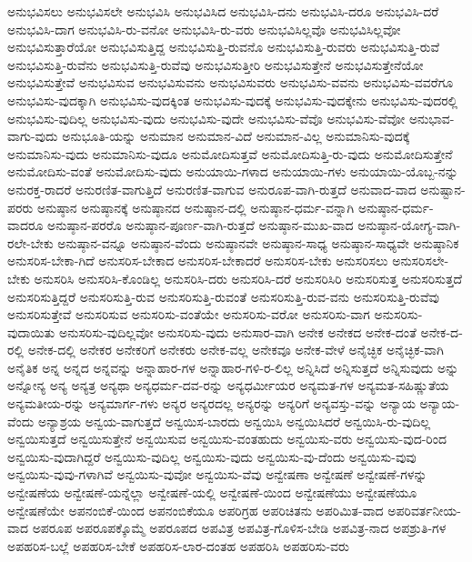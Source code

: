 {ಅನುಭವಿಸಲು
ಅನುಭವಿಸಲೇ
ಅನುಭವಿಸಿ
ಅನುಭವಿಸಿದ
ಅನುಭವಿಸಿ-ದನು
ಅನುಭವಿಸಿ-ದರೂ
ಅನುಭವಿಸಿ-ದರೆ
ಅನುಭವಿಸಿ-ದಾಗ
ಅನುಭವಿಸಿ-ರು-ವನೋ
ಅನುಭವಿಸಿ-ರು-ವರು
ಅನುಭವಿಸಿಲ್ಲವೊ
ಅನುಭವಿಸಿಲ್ಲವೋ
ಅನುಭವಿಸುತ್ತಾರೆಯೋ
ಅನುಭವಿಸುತ್ತಿದ್ದ
ಅನುಭವಿಸುತ್ತಿ-ರುವನೊ
ಅನುಭವಿಸುತ್ತಿ-ರುವರು
ಅನುಭವಿಸುತ್ತಿ-ರುವೆ
ಅನುಭವಿಸುತ್ತಿ-ರುವೆನು
ಅನುಭವಿಸುತ್ತಿ-ರುವೆವು
ಅನುಭವಿಸುತ್ತೀರಿ
ಅನುಭವಿಸುತ್ತೇನೆ
ಅನುಭವಿಸುತ್ತೇನೆಯೋ
ಅನುಭವಿಸುತ್ತೇವೆ
ಅನುಭವಿಸುವ
ಅನುಭವಿಸುವನು
ಅನುಭವಿಸುವರು
ಅನುಭವಿಸು-ವವನು
ಅನುಭವಿಸು-ವವರೆಗೂ
ಅನುಭವಿಸು-ವುದಕ್ಕಾಗಿ
ಅನುಭವಿಸು-ವುದಕ್ಕಿಂತ
ಅನುಭವಿಸು-ವುದಕ್ಕೆ
ಅನುಭವಿಸು-ವುದಕ್ಕೇನು
ಅನುಭವಿಸು-ವುದರಲ್ಲಿ
ಅನುಭವಿಸು-ವುದಿಲ್ಲ
ಅನುಭವಿಸು-ವುದು
ಅನುಭವಿಸು-ವುದೇ
ಅನುಭವಿಸು-ವೆವೊ
ಅನುಭವಿಸು-ವೆವೋ
ಅನುಭಾವ-ವಾಗು-ವುದು
ಅನುಭೂತಿ-ಯನ್ನು
ಅನುಮಾನ
ಅನುಮಾನ-ವಿದೆ
ಅನುಮಾನ-ವಿಲ್ಲ
ಅನುಮಾನಿಸು-ವುದಕ್ಕೆ
ಅನುಮಾನಿಸು-ವುದು
ಅನುಮಾನಿಸು-ವುದೂ
ಅನುಮೋದಿಸುತ್ತವೆ
ಅನುಮೋದಿಸುತ್ತಿ-ರು-ವುದು
ಅನುಮೋದಿಸುತ್ತೇನೆ
ಅನುಮೋದಿಸು-ವಂತೆ
ಅನುಮೋದಿಸು-ವುದು
ಅನುಯಾಯಿ-ಗಳಾದ
ಅನುಯಾಯಿ-ಗಳು
ಅನುಯಾಯಿ-ಯೊಬ್ಬ-ನನ್ನು
ಅನುರಕ್ತ-ರಾದರೆ
ಅನುರಣಿತ-ವಾಗುತ್ತಿದೆ
ಅನುರಣಿತ-ವಾಗುವ
ಅನುರೂಪ-ವಾಗಿ-ರುತ್ತದೆ
ಅನುವಾದ-ವಾದ
ಅನುಷ್ಟಾನ-ಪರರು
ಅನುಷ್ಠಾನ
ಅನುಷ್ಠಾನಕ್ಕೆ
ಅನುಷ್ಠಾನದ
ಅನುಷ್ಠಾನ-ದಲ್ಲಿ
ಅನುಷ್ಠಾನ-ಧರ್ಮ-ವನ್ನಾಗಿ
ಅನುಷ್ಠಾನ-ಧರ್ಮ-ವಾದರೂ
ಅನುಷ್ಠಾನ-ಪರರೊ
ಅನುಷ್ಠಾನ-ಪೂರ್ಣ-ವಾಗಿ-ರುತ್ತದೆ
ಅನುಷ್ಠಾನ-ಮುಖ-ವಾದ
ಅನುಷ್ಠಾನ-ಯೋಗ್ಯ-ವಾಗಿ-ರಲೇ-ಬೇಕು
ಅನುಷ್ಠಾನ-ವನ್ನೂ
ಅನುಷ್ಠಾನ-ವೆಂದು
ಅನುಷ್ಠಾನವೇ
ಅನುಷ್ಠಾನ-ಸಾಧ್ಯ
ಅನುಷ್ಠಾನ-ಸಾಧ್ಯವೇ
ಅನುಷ್ಠಾನಿಕ
ಅನುಸರಿಸ-ಬೇಕಾ-ಗಿದೆ
ಅನುಸರಿಸ-ಬೇಕಾದ
ಅನುಸರಿಸ-ಬೇಕಾದರೆ
ಅನುಸರಿಸ-ಬೇಕು
ಅನುಸರಿಸಲು
ಅನುಸರಿಸಲೇ-ಬೇಕು
ಅನುಸರಿಸಿ
ಅನುಸರಿಸಿ-ಕೊಂಡಿಲ್ಲ
ಅನುಸರಿಸಿ-ದರು
ಅನುಸರಿಸಿ-ದರೆ
ಅನುಸರಿಸಿರಿ
ಅನುಸರಿಸುತ್ತ
ಅನುಸರಿಸುತ್ತದೆ
ಅನುಸರಿಸುತ್ತಿದ್ದರೆ
ಅನುಸರಿಸುತ್ತಿ-ರುವ
ಅನುಸರಿಸುತ್ತಿ-ರುವಂತೆ
ಅನುಸರಿಸುತ್ತಿ-ರುವ-ವನು
ಅನುಸರಿಸುತ್ತಿ-ರುವೆವು
ಅನುಸರಿಸುತ್ತೇವೆ
ಅನುಸರಿಸುವ
ಅನುಸರಿಸು-ವಂತೆಯೇ
ಅನುಸರಿಸು-ವರೋ
ಅನುಸರಿಸು-ವಾಗ
ಅನುಸರಿಸು-ವುದಾಯಿತು
ಅನುಸರಿಸು-ವುದಿಲ್ಲವೋ
ಅನುಸರಿಸು-ವುದು
ಅನುಸಾರ-ವಾಗಿ
ಅನೇಕ
ಅನೇಕದ
ಅನೇಕ-ದಂತೆ
ಅನೇಕ-ದ-ರಲ್ಲಿ
ಅನೇಕ-ದಲ್ಲಿ
ಅನೇಕರ
ಅನೇಕರಿಗೆ
ಅನೇಕರು
ಅನೇಕ-ವಲ್ಲ
ಅನೇಕವೂ
ಅನೇಕ-ವೇಳೆ
ಅನೈಚ್ಛಿಕ
ಅನೈಚ್ಛಿಕ-ವಾಗಿ
ಅನೈತಿಕ
ಅನ್ನ
ಅನ್ನದ
ಅನ್ನವನ್ನು
ಅನ್ನಾಹಾರ-ಗಳ
ಅನ್ನಾಹಾರ-ಗಳಿ-ರ-ಲಿಲ್ಲ
ಅನ್ನಿಸಿದೆ
ಅನ್ನಿಸುತ್ತದೆ
ಅನ್ನಿಸುವುದು
ಅನ್ನು
ಅನ್ನೋನ್ಯ
ಅನ್ಯ
ಅನ್ಯತ್ರ
ಅನ್ಯಥಾ
ಅನ್ಯಧರ್ಮ-ದವ-ರನ್ನು
ಅನ್ಯಧರ್ಮೀಯರ
ಅನ್ಯಮತ-ಗಳ
ಅನ್ಯಮತ-ಸಹಿಷ್ಣುತೆಯ
ಅನ್ಯಮತೀಯ-ರನ್ನು
ಅನ್ಯಮಾರ್ಗ-ಗಳು
ಅನ್ಯರ
ಅನ್ಯರದಲ್ಲ
ಅನ್ಯರನ್ನು
ಅನ್ಯರಿಗೆ
ಅನ್ಯವಸ್ತು-ವನ್ನು
ಅನ್ಯಾಯ
ಅನ್ಯಾಯ-ವೆಂದು
ಅನ್ಯಾಶ್ರಯ
ಅನ್ವಯ-ವಾಗುತ್ತದೆ
ಅನ್ವಯಿಸ-ಬಾರದು
ಅನ್ವಯಿಸಿ
ಅನ್ವಯಿಸಿದರೆ
ಅನ್ವಯಿಸಿ-ರು-ವುದಿಲ್ಲ
ಅನ್ವಯಿಸುತ್ತದೆ
ಅನ್ವಯಿಸುತ್ತೇನೆ
ಅನ್ವಯಿಸುವ
ಅನ್ವಯಿಸು-ವಂತಹುದು
ಅನ್ವಯಿಸು-ವರು
ಅನ್ವಯಿಸು-ವುದ-ರಿಂದ
ಅನ್ವಯಿಸು-ವುದಾಗಿದ್ದರೆ
ಅನ್ವಯಿಸು-ವುದಿಲ್ಲ
ಅನ್ವಯಿಸು-ವುದು
ಅನ್ವಯಿಸು-ವು-ದೆಂದು
ಅನ್ವಯಿಸು-ವುವು
ಅನ್ವಯಿಸು-ವುವು-ಗಳಾಗಿವೆ
ಅನ್ವಯಿಸು-ವುವೋ
ಅನ್ವಯಿಸು-ವೆವು
ಅನ್ವೇಷಣಾ
ಅನ್ವೇಷಣೆ
ಅನ್ವೇಷಣೆ-ಗಳನ್ನು
ಅನ್ವೇಷಣೆಯ
ಅನ್ವೇಷಣೆ-ಯನ್ನೆಲ್ಲಾ
ಅನ್ವೇಷಣೆ-ಯಲ್ಲಿ
ಅನ್ವೇಷಣೆ-ಯಿಂದ
ಅನ್ವೇಷಣೆಯು
ಅನ್ವೇಷಣೆಯೂ
ಅನ್ವೇಷಣೆಯೇ
ಅಪನಂಬಿಕೆ-ಯಿಂದ
ಅಪನಂಬಿಕೆಯೂ
ಅಪರಿಗ್ರಹ
ಅಪರಿಚಿತನು
ಅಪರಿಮಿತ-ವಾದ
ಅಪರಿವರ್ತನೀಯ-ವಾದ
ಅಪರೂಪ
ಅಪರೂಪಕ್ಕೊಮ್ಮೆ
ಅಪರೂಪದ
ಅಪವಿತ್ರ
ಅಪವಿತ್ರ-ಗೊಳಿಸ-ಬೇಡಿ
ಅಪವಿತ್ರ-ನಾದ
ಅಪಶ್ರುತಿ-ಗಳ
ಅಪಹರಿಸ-ಬಲ್ಲೆ
ಅಪಹರಿಸ-ಬೇಕೆ
ಅಪಹರಿಸ-ಲಾರ-ದಂತಹ
ಅಪಹರಿಸಿ
ಅಪಹರಿಸು-ವರು
}
